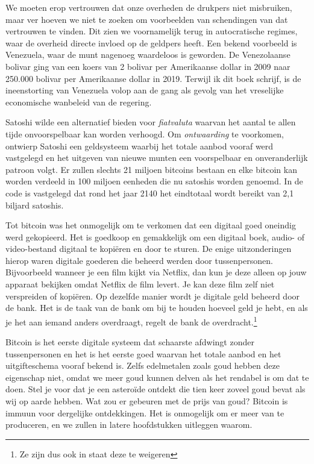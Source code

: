\documentclass[smalldemyvopaper,11pt,twoside,onecolumn,openright,extrafontsizes]{memoir}
\begin{document}
We moeten erop vertrouwen dat onze overheden de drukpers niet misbruiken, maar ver hoeven we niet te zoeken om voorbeelden van schendingen van dat vertrouwen te vinden. Dit zien we voornamelijk terug in autocratische regimes, waar de overheid directe invloed op de geldpers heeft. Een bekend voorbeeld is Venezuela, waar de munt nagenoeg waardeloos is geworden. De Venezolaanse bolivar ging van een koers van 2 bolivar per Amerikaanse dollar in 2009 naar 250.000 bolivar per Amerikaanse dollar in 2019. Terwijl ik dit boek schrijf, is de ineenstorting van Venezuela volop aan de gang als gevolg van het vreselijke economische wanbeleid van de regering.

Satoshi wilde een alternatief bieden voor \textit{fiatvaluta} waarvan het aantal te allen tijde onvoorspelbaar kan worden verhoogd. Om \textit{ontwaarding} te voorkomen, ontwierp Satoshi een geldsysteem waarbij het totale aanbod vooraf werd vastgelegd en het uitgeven van nieuwe munten een voorspelbaar en onveranderlijk patroon volgt. Er zullen slechts 21 miljoen bitcoins bestaan en elke bitcoin kan worden verdeeld in 100 miljoen eenheden die nu satoshis worden genoemd. In de code is vastgelegd dat rond het jaar 2140 het eindtotaal wordt bereikt van 2,1 biljard satoshis.

Tot bitcoin was het onmogelijk om te verkomen dat een digitaal goed oneindig werd gekopieerd. Het is goedkoop en gemakkelijk om een digitaal boek, audio- of video-bestand digitaal te kopiëren en door te sturen. De enige uitzonderingen hierop waren digitale goederen die beheerd werden door tussenpersonen. Bijvoorbeeld wanneer je een film kijkt via Netflix, dan kun je deze alleen op jouw apparaat bekijken omdat Netflix de film levert. Je kan deze film zelf niet verspreiden of kopiëren. Op dezelfde manier wordt je digitale geld beheerd door de bank. Het is de taak van de bank om bij te houden hoeveel geld je hebt, en als je het aan iemand anders overdraagt, regelt de bank de overdracht.\footnote{Ze zijn dus ook in staat deze te weigeren}

Bitcoin is het eerste digitale systeem dat schaarste afdwingt zonder tussenpersonen en het is het eerste goed waarvan het totale aanbod en het uitgifteschema vooraf bekend is. Zelfs edelmetalen zoals goud hebben deze eigenschap niet, omdat we meer goud kunnen delven als het rendabel is om dat te doen. Stel je voor dat je een asteroïde ontdekt die tien keer zoveel goud bevat als wij op aarde hebben. Wat zou er gebeuren met de prijs van goud? Bitcoin is immuun voor dergelijke ontdekkingen. Het is onmogelijk om er meer van te produceren, en we zullen in latere hoofdstukken uitleggen waarom.
 
\end{document}
